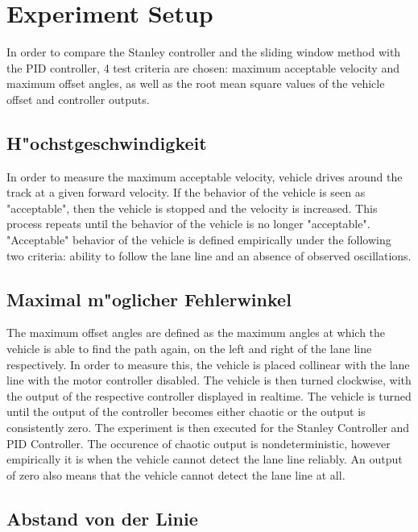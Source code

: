 \documentclass[arbeit=studie,oneside,BCOR=12mm]{ArbeitRST}
\begin{document}
\section{Experiment Setup}

In order to compare the Stanley controller and the sliding window method with
the PID controller, 4 test criteria are chosen: maximum acceptable velocity and
maximum offset angles, as well as the root mean square values of the vehicle
offset and controller outputs.

\subsection{H"ochstgeschwindigkeit}

In order to measure the maximum acceptable velocity, vehicle drives around the
track at a given forward velocity. If the behavior of the vehicle is seen as
"acceptable", then the vehicle is stopped and the velocity is increased. This
process repeats until the behavior of the vehicle is no longer "acceptable".
"Acceptable" behavior of the vehicle is defined empirically under the following
two criteria: ability to follow the lane line and an absence of observed
oscillations.

\subsection{Maximal m"oglicher Fehlerwinkel}

The maximum offset angles are defined as the maximum angles at which the
vehicle is able to find the path again, on the left and right of the lane line
respectively. In order to measure this, the vehicle is placed collinear with
the lane line with the motor controller disabled. The vehicle is then turned
clockwise, with the output of the respective controller displayed in realtime.
The vehicle is turned until the output of the controller becomes either chaotic
or the output is consistently zero. The experiment is then executed for the
Stanley Controller and PID Controller. The occurence of chaotic output is
nondeterministic, however empirically it is when the vehicle cannot detect the
lane line reliably. An output of zero also means that the vehicle cannot detect
the lane line at all.

\subsection{Abstand von der Linie}
\end{document}
